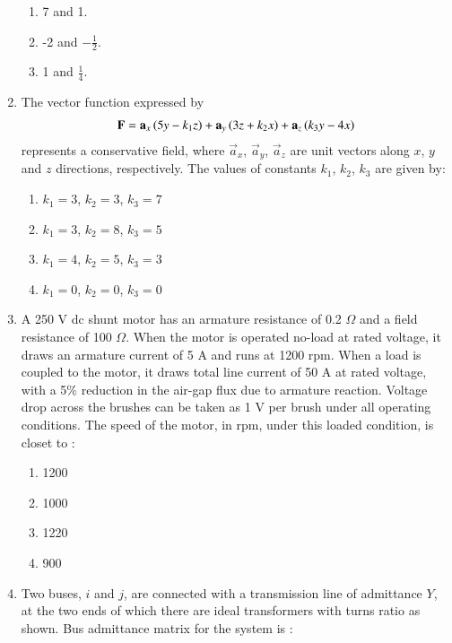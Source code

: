 \documentclass[journal]{IEEEtran}
\begin{document}
\begin{enumerate}
\begin{enumerate}
    \item 7 and 1.
    \item -2 and $-\frac{1}{2}$.
    \item 1 and $\frac{1}{4}$. \\ 
\end{enumerate}
\item The vector function expressed by
\begin{align*}
    \mathbf{F} = \mathbf{a}_x\left(5y - k_1z\right) + \mathbf{a}_y\left(3z + k_2x\right)  +\mathbf{a}_z\left(k_3y - 4x\right)
\end{align*}
represents a conservative field, where $\vec{a}_x$, $\vec{a}_y$, $\vec{a}_z$ are unit vectors along $x$, $y$ and $z$ directions, respectively. The values of constants $k_1$, $k_2$, $k_3$ are given by:
\begin{enumerate}
    \item $k_1 = 3$, $k_2 = 3$, $k_3 = 7$
    \item $k_1 = 3$, $k_2 = 8$, $k_3 = 5$
    \item $k_1 = 4$, $k_2 = 5$, $k_3 = 3$
    \item $k_1 = 0$, $k_2 = 0$, $k_3 = 0$ \\
\end{enumerate}
\item A 250 V dc shunt motor has an armature resistance of 0.2 $\Omega$ and a field resistance of 100 $\Omega$. When the motor is operated no-load at rated voltage, it draws an armature current of 5 A and runs at 1200 rpm. When a load is coupled to the motor, it draws total line current of 50 A at rated voltage, with a 5\% reduction in the air-gap flux due to armature reaction. Voltage drop across the brushes can be taken as 1 V per brush under all operating conditions. The speed of the motor, in rpm, under this loaded condition,
is closet to :
\begin{enumerate}
    \item 1200
    \item 1000
    \item 1220
    \item 900 \\
\end{enumerate}
\item Two buses, $i$ and $j$, are connected with a transmission line of admittance $Y$, at the two ends of which there are ideal transformers with turns ratio as shown. Bus admittance matrix for the system is :
\begin{figure}[!ht]
\centering
\resizebox{0.7\textwidth}{!}{%

}
\end{figure}
\end{enumerate}
\end{document}
